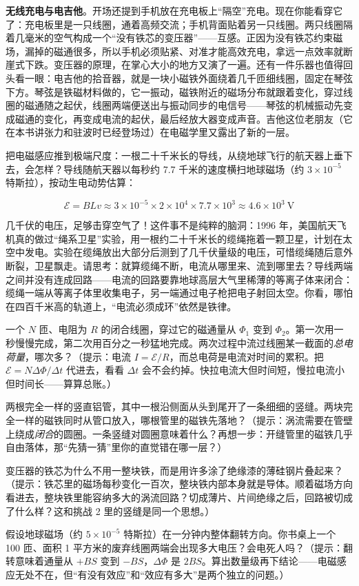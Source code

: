 \textbf{无线充电与电吉他}。开场还提到手机放在充电板上“隔空”充电。现在你能看穿它了：充电板里是一只线圈，通着高频交流；手机背面贴着另一只线圈。两只线圈隔着几毫米的空气构成一个“没有铁芯的变压器”——互感。正因为没有铁芯约束磁场，漏掉的磁通很多，所以手机必须贴紧、对准才能高效充电，拿远一点效率就断崖式下跌。变压器的原理，在掌心大小的地方又演了一遍。还有一件乐器也值得回头看一眼：电吉他的拾音器，就是一块小磁铁外面绕着几千匝细线圈，固定在琴弦下方。琴弦是铁磁材料做的，它一振动，磁铁附近的磁场分布就跟着变化，穿过线圈的磁通随之起伏，线圈两端便送出与振动同步的电信号——琴弦的机械振动先变成磁通的变化，再变成电流的起伏，最后经放大器变成声音。吉他这位老朋友（它在本书讲张力和驻波时已经登场过）在电磁学里又露出了新的一层。


\begin{thought}[太空里的发电缆绳]
把电磁感应推到极端尺度：一根二十千米长的导线，从绕地球飞行的航天器上垂下去，会怎样？导线随航天器以每秒约 7.7 千米的速度横扫地球磁场（约 \(3\times10^{-5}\) 特斯拉），按动生电动势估算：

\[
\mathcal{E}=BLv\approx 3\times10^{-5}\times2\times10^{4}\times7.7\times10^{3}\approx 4.6\times10^{3}\ \mathrm{V}
\]

几千伏的电压，足够击穿空气了！这件事不是纯粹的脑洞：1996 年，美国航天飞机真的做过“绳系卫星”实验，用一根约二十千米长的缆绳拖着一颗卫星，计划在太空中发电。实验在缆绳放出大部分后测到了几千伏量级的电压，可惜缆绳随后意外断裂，卫星飘走。请思考：就算缆绳不断，电流从哪里来、流到哪里去？导线两端之间并没有连成回路——电流的回路要靠地球高层大气里稀薄的等离子体来闭合：缆绳一端从等离子体里收集电子，另一端通过电子枪把电子射回太空。你看，哪怕在四百千米高的轨道上，“电流必须成环”依然是铁律。
\end{thought}

\begin{puzzles}
\item 一个 \(N\) 匝、电阻为 \(R\) 的闭合线圈，穿过它的磁通量从 \(\Phi_1\) 变到 \(\Phi_2\)。第一次用一秒慢慢完成，第二次用百分之一秒猛地完成。两次过程中流过线圈某一截面的\emph{总电荷量}，哪次多？（提示：电流 \(I=\mathcal{E}/R\)，而总电荷是电流对时间的累积。把 \(\mathcal{E}=N\Delta\Phi/\Delta t\) 代进去，看看 \(\Delta t\) 会不会约掉。快拉电流大但时间短，慢拉电流小但时间长——算算总账。）
\item 两根完全一样的竖直铝管，其中一根沿侧面从头到尾开了一条细细的竖缝。两块完全一样的磁铁同时从管口放入，哪根管里的磁铁先落地？（提示：涡流需要在管壁上绕成\emph{闭合}的圆圈。一条竖缝对圆圈意味着什么？再想一步：开缝管里的磁铁几乎自由落体，那“先猜一猜”里你的直觉错在哪一层？）
\item 变压器的铁芯为什么不用一整块铁，而是用许多涂了绝缘漆的薄硅钢片叠起来？（提示：铁芯里的磁场每秒变化一百次，整块铁内部本身就是导体。顺着磁场方向看进去，整块铁里能容纳多大的涡流回路？切成薄片、片间绝缘之后，回路被切成了什么样？这和挑战 2 里的竖缝是同一个思想。）
\item 假设地球磁场（约 \(5\times10^{-5}\) 特斯拉）在一分钟内整体翻转方向。你书桌上一个 100 匝、面积 1 平方米的废弃线圈两端会出现多大电压？会电死人吗？（提示：翻转意味着通量从 \(+BS\) 变到 \(-BS\)，\(\Delta\Phi\) 是 \(2BS\)。算出数量级再下结论——电磁感应无处不在，但“有没有效应”和“效应有多大”是两个独立的问题。）
\end{puzzles}
